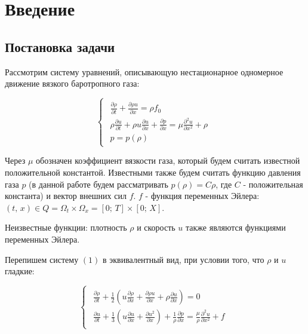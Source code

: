 \section{Введение}
\subsection{Постановка задачи}

Рассмотрим систему уравнений, описывающую нестационарное одномерное движение вязкого баротропного газа:

\begin{equation} \label{eq:task}
	\begin{cases}
		\begin{array}{l}
			\frac{\partial\rho}{\partial t} + \frac{\partial \rho u}{\partial x} = \rho f_0 \\
			\rho \frac{\partial u}{\partial t} + \rho u \frac{\partial u}{\partial x} + \frac{\partial p}{\partial x} = \mu \frac{\partial^2u}{\partial x^2} + \rho \\
			p = p(\rho)
		\end{array}
	\end{cases}
\end{equation}

Через $\mu$ обозначен коэффициент вязкости газа, который будем считать известной положительной
константой. Известными также будем считать функцию давления газа $p$ (в данной работе будем рассматривать $p(\rho) = C\rho$, где $C$ - положительная константа) и вектор внешних сил $f$. $f$ - функция переменных Эйлера: $(t, \, x) \in Q = \Omega_t \times \Omega_x = [0; \, T] \times [0; \, X]$.

Неизвестные функции: плотность $\rho$ и скорость $u$ также являются функциями переменных Эйлера.

Перепишем систему $(1)$ в эквивалентный вид, при условии того, что $\rho$ и $u$ гладкие: 

\begin{equation} \label{eq:task_reformulate}
	\begin{cases}
		\begin{array}{l}
			\frac{\partial \rho}{\partial t} + \frac{1}{2}\left(u\frac{\partial \rho}{\partial x} + \frac{\partial \rho u}{\partial x} + \rho \frac{\partial u}{\partial x}\right) = 0\\
			\frac{\partial u}{\partial t} + \frac{1}{3}\left(u\frac{\partial u}{\partial x} + \frac{\partial u^2}{\partial x}\right) +\frac{1}{\rho}\frac{\partial p}{\partial x} = \frac{\mu}{\rho}\frac{\partial^2 u}{\partial x^2} + f			
		\end{array}
	\end{cases}
\end{equation}


